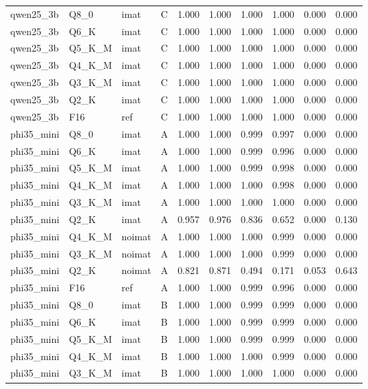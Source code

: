 \begin{tabular}{llllrrrrrr}
qwen25\_3b & Q8\_0 & imat & C & 1.000 & 1.000 & 1.000 & 1.000 & 0.000 & 0.000 \\
qwen25\_3b & Q6\_K & imat & C & 1.000 & 1.000 & 1.000 & 1.000 & 0.000 & 0.000 \\
qwen25\_3b & Q5\_K\_M & imat & C & 1.000 & 1.000 & 1.000 & 1.000 & 0.000 & 0.000 \\
qwen25\_3b & Q4\_K\_M & imat & C & 1.000 & 1.000 & 1.000 & 1.000 & 0.000 & 0.000 \\
qwen25\_3b & Q3\_K\_M & imat & C & 1.000 & 1.000 & 1.000 & 1.000 & 0.000 & 0.000 \\
qwen25\_3b & Q2\_K & imat & C & 1.000 & 1.000 & 1.000 & 1.000 & 0.000 & 0.000 \\
qwen25\_3b & F16 & ref & C & 1.000 & 1.000 & 1.000 & 1.000 & 0.000 & 0.000 \\
phi35\_mini & Q8\_0 & imat & A & 1.000 & 1.000 & 0.999 & 0.997 & 0.000 & 0.000 \\
phi35\_mini & Q6\_K & imat & A & 1.000 & 1.000 & 0.999 & 0.996 & 0.000 & 0.000 \\
phi35\_mini & Q5\_K\_M & imat & A & 1.000 & 1.000 & 0.999 & 0.998 & 0.000 & 0.000 \\
phi35\_mini & Q4\_K\_M & imat & A & 1.000 & 1.000 & 1.000 & 0.998 & 0.000 & 0.000 \\
phi35\_mini & Q3\_K\_M & imat & A & 1.000 & 1.000 & 1.000 & 1.000 & 0.000 & 0.000 \\
phi35\_mini & Q2\_K & imat & A & 0.957 & 0.976 & 0.836 & 0.652 & 0.000 & 0.130 \\
phi35\_mini & Q4\_K\_M & noimat & A & 1.000 & 1.000 & 1.000 & 0.999 & 0.000 & 0.000 \\
phi35\_mini & Q3\_K\_M & noimat & A & 1.000 & 1.000 & 1.000 & 0.999 & 0.000 & 0.000 \\
phi35\_mini & Q2\_K & noimat & A & 0.821 & 0.871 & 0.494 & 0.171 & 0.053 & 0.643 \\
phi35\_mini & F16 & ref & A & 1.000 & 1.000 & 0.999 & 0.996 & 0.000 & 0.000 \\
phi35\_mini & Q8\_0 & imat & B & 1.000 & 1.000 & 0.999 & 0.999 & 0.000 & 0.000 \\
phi35\_mini & Q6\_K & imat & B & 1.000 & 1.000 & 0.999 & 0.999 & 0.000 & 0.000 \\
phi35\_mini & Q5\_K\_M & imat & B & 1.000 & 1.000 & 0.999 & 0.999 & 0.000 & 0.000 \\
phi35\_mini & Q4\_K\_M & imat & B & 1.000 & 1.000 & 1.000 & 0.999 & 0.000 & 0.000 \\
phi35\_mini & Q3\_K\_M & imat & B & 1.000 & 1.000 & 1.000 & 1.000 & 0.000 & 0.000 \\

\end{tabular}
